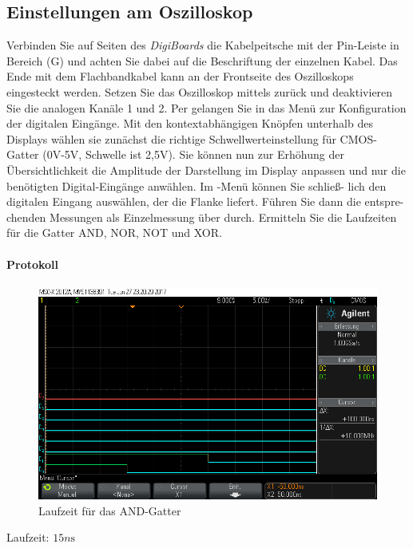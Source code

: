 \documentclass[10pt]{scrreprt}
\begin{document}
    \subsection{Einstellungen am Oszilloskop}
    Verbinden Sie auf Seiten des \textit{DigiBoards} die Kabelpeitsche mit der Pin-Leiste in Bereich
    (G) und achten Sie dabei auf die Beschriftung der einzelnen Kabel. Das Ende mit dem
    Flachbandkabel kann an der Frontseite des Oszilloskops eingesteckt werden. Setzen Sie
    das Oszilloskop mittels  zurück und deaktivieren Sie die analogen Kanäle
    1 und 2. Per  gelangen Sie in das Menü zur Konfiguration der digitalen Eingänge.
    Mit den kontextabhängigen Knöpfen unterhalb des Displays wählen sie zunächst die richtige
    Schwellwerteinstellung für CMOS-Gatter (0V-5V, Schwelle ist 2,5V). Sie können nun
    zur Erhöhung der Übersichtlichkeit die Amplitude der Darstellung im Display anpassen
    und nur die benötigten Digital-Eingänge anwählen. Im -Menü können Sie schließ-
    lich den digitalen Eingang auswählen, der die Flanke liefert. Führen Sie dann die entspre-
    chenden Messungen als Einzelmessung über  durch. Ermitteln Sie die Laufzeiten
    für die Gatter AND, NOR, NOT und XOR.

    \paragraph{Protokoll}
    \begin{figure}[H]
        \includegraphics[width=\textwidth]{scope_8.png}
        \caption{Laufzeit für das AND-Gatter}
    \end{figure}

    Laufzeit: $15\si{n\second}$
\end{document}
